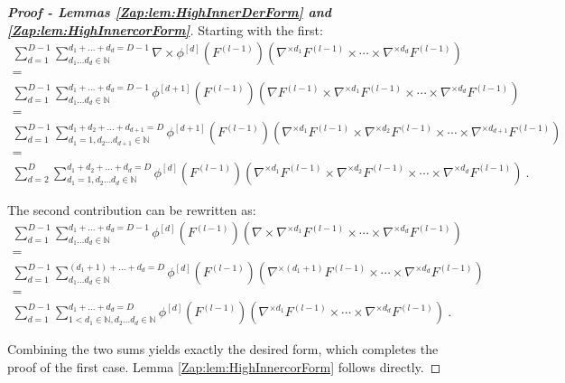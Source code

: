 \documentclass{article} %
\begin{document}
\begin{proof}[\textbf{Proof - Lemmas \ref{Zap:lem:HighInnerDerForm} and \ref{Zap:lem:HighInnercorForm}}]
Starting with the first:
\begin{equation}
\begin{array}{c}
\sum_{d=1}^{D-1}\sum_{d_{1}\ldots d_{d}\in\mathbb{N}}^{d_{1}+\ldots+d_{d}=D-1}\nabla\times\phi^{\left[d\right]}\left(F^{(l-1)}\right)\left(\nabla^{\times d_{1}}F^{(l-1)}\times\cdots\times\nabla^{\times d_{d}}F^{(l-1)}\right)\\
=\\
\sum_{d=1}^{D-1}\sum_{d_{1}\ldots d_{d}\in\mathbb{N}}^{d_{1}+\ldots+d_{d}=D-1}\phi^{\left[d+1\right]}\left(F^{(l-1)}\right)\left(\nabla F^{(l-1)}\times\nabla^{\times d_{1}}F^{(l-1)}\times\cdots\times\nabla^{\times d_{d}}F^{(l-1)}\right)\\
=\\
\sum_{d=1}^{D-1}\sum_{d_{1}=1,d_{2}\ldots d_{d+1}\in\mathbb{N}}^{d_{1}+d_{2}+\ldots+d_{d+1}=D}\phi^{\left[d+1\right]}\left(F^{(l-1)}\right)\left(\nabla^{\times d_{1}}F^{(l-1)}\times\nabla^{\times d_{2}}F^{(l-1)}\times\cdots\times\nabla^{\times d_{d+1}}F^{(l-1)}\right)\\
=\\
\sum_{d=2}^{D}\sum_{d_{1}=1,d_{2}\ldots d_{d}\in\mathbb{N}}^{d_{1}+d_{2}+\ldots+d_{d}=D}\phi^{\left[d\right]}\left(F^{(l-1)}\right)\left(\nabla^{\times d_{1}}F^{(l-1)}\times\nabla^{\times d_{2}}F^{(l-1)}\times\cdots\times\nabla^{\times d_{d}}F^{(l-1)}\right) \ .
\end{array}
\end{equation}

The second contribution can be rewritten as:
\begin{equation}
\begin{array}{c}
\sum_{d=1}^{D-1}\sum_{d_{1}\ldots d_{d}\in\mathbb{N}}^{d_{1}+\ldots+d_{d}=D-1}\phi^{\left[d\right]}\left(F^{(l-1)}\right)\left(\nabla\times\nabla^{\times d_{1}}F^{(l-1)}\times\cdots\times\nabla^{\times d_{d}}F^{(l-1)}\right)\\
=\\
\sum_{d=1}^{D-1}\sum_{d_{1}\ldots d_{d}\in\mathbb{N}}^{\left(d_{1}+1\right)+\ldots+d_{d}=D}\phi^{\left[d\right]}\left(F^{(l-1)}\right)\left(\nabla^{\times \left(d_{1}+1\right)}F^{(l-1)}\times\cdots\times\nabla^{\times d_{d}}F^{(l-1)}\right)\\
=\\
\sum_{d=1}^{D-1}\sum_{1<d_{1}\in\mathbb{N},d_{2}\ldots d_{d}\in\mathbb{N}}^{d_{1}+\ldots+d_{d}=D}\phi^{\left[d\right]}\left(F^{(l-1)}\right)\left(\nabla^{\times d_{1}}F^{(l-1)}\times\cdots\times\nabla^{\times d_{d}}F^{(l-1)}\right) \ .
\end{array}
\end{equation}

Combining the two sums yields exactly the desired form, which completes the proof of the first case. Lemma \ref{Zap:lem:HighInnercorForm} follows directly.
\end{proof}
\end{document}
